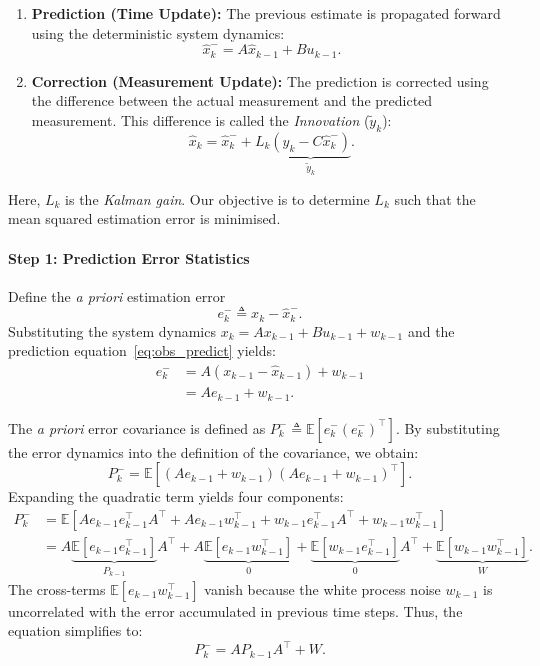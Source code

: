 \begin{enumerate}
	\item \textbf{Prediction (Time Update):}  
	The previous estimate is propagated forward using the deterministic system dynamics:
	\begin{equation} \label{eq:obs_predict}
		\hat{x}_k^- = A \hat{x}_{k-1} + B u_{k-1}.
	\end{equation}
	
	\item \textbf{Correction (Measurement Update):}  
	The prediction is corrected using the difference between the actual measurement and the predicted measurement. This difference is called the \emph{Innovation} ($\tilde{y}_k$):
	\begin{equation} \label{eq:obs_correct}
		\hat{x}_k = \hat{x}_k^- + L_k \underbrace{(y_k - C \hat{x}_k^-)}_{\tilde{y}_k}.
	\end{equation}
\end{enumerate}

Here, $L_k$ is the \emph{Kalman gain}. Our objective is to determine $L_k$ such that the mean squared estimation error is minimised.

\paragraph{Step 1: Prediction Error Statistics}

Define the \textit{a priori} estimation error
\[
e_k^- \triangleq x_k - \hat{x}_k^-.
\]
Substituting the system dynamics $x_k = A x_{k-1} + B u_{k-1} + w_{k-1}$ and the prediction equation~\eqref{eq:obs_predict} yields:
\begin{align*}
	e_k^- 
	&= A(x_{k-1} - \hat{x}_{k-1}) + w_{k-1} \nonumber \\
	&= A e_{k-1} + w_{k-1}.
\end{align*}

The \textit{a priori} error covariance is defined as $P_k^- \triangleq \mathbb{E}[e_k^- (e_k^-)^\top]$.
By substituting the error dynamics into the definition of the covariance, we obtain:
\begin{equation*}
	P_k^- = \mathbb{E}\left[ (A e_{k-1} + w_{k-1}) (A e_{k-1} + w_{k-1})^\top \right].
\end{equation*}
Expanding the quadratic term yields four components:
\begin{align*}
	P_k^- &= \mathbb{E}\left[ A e_{k-1} e_{k-1}^\top A^\top + A e_{k-1} w_{k-1}^\top + w_{k-1} e_{k-1}^\top A^\top + w_{k-1} w_{k-1}^\top \right] \nonumber \\
	&= A \underbrace{\mathbb{E}[e_{k-1} e_{k-1}^\top]}_{P_{k-1}} A^\top + A \underbrace{\mathbb{E}[e_{k-1} w_{k-1}^\top]}_{0} + \underbrace{\mathbb{E}[w_{k-1} e_{k-1}^\top]}_{0} A^\top + \underbrace{\mathbb{E}[w_{k-1} w_{k-1}^\top]}_{W}.
\end{align*}
The cross-terms $\mathbb{E}[e_{k-1} w_{k-1}^\top]$ vanish because the white process noise $w_{k-1}$ is uncorrelated with the error accumulated in previous time steps. Thus, the equation simplifies to:
\begin{equation*}
	P_k^- = A P_{k-1} A^\top + W.
\end{equation*}


